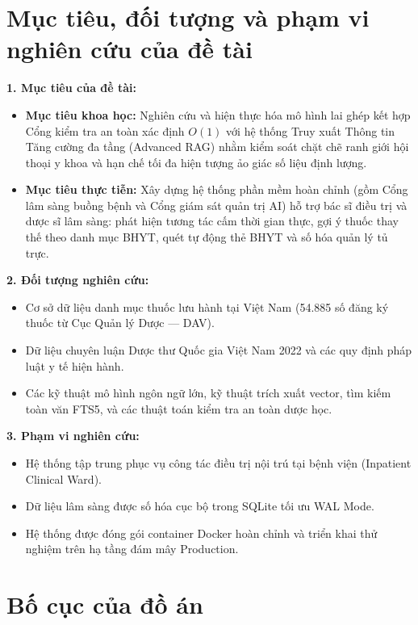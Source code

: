 \section{Mục tiêu, đối tượng và phạm vi nghiên cứu của đề tài}
\label{sec:objectives_scope}

\noindent\textbf{1. Mục tiêu của đề tài:}
\begin{itemize}[leftmargin=1.5em]
    \item \textbf{Mục tiêu khoa học:} Nghiên cứu và hiện thực hóa mô hình lai ghép kết hợp Cổng kiểm tra an toàn xác định $O(1)$ với hệ thống Truy xuất Thông tin Tăng cường đa tầng (Advanced RAG) nhằm kiểm soát chặt chẽ ranh giới hội thoại y khoa và hạn chế tối đa hiện tượng ảo giác số liệu định lượng.
    \item \textbf{Mục tiêu thực tiễn:} Xây dựng hệ thống phần mềm hoàn chỉnh (gồm Cổng lâm sàng buồng bệnh và Cổng giám sát quản trị AI) hỗ trợ bác sĩ điều trị và dược sĩ lâm sàng: phát hiện tương tác cấm thời gian thực, gợi ý thuốc thay thế theo danh mục BHYT, quét tự động thẻ BHYT và số hóa quản lý tủ trực.
\end{itemize}

\noindent\textbf{2. Đối tượng nghiên cứu:}
\begin{itemize}[leftmargin=1.5em]
    \item Cơ sở dữ liệu danh mục thuốc lưu hành tại Việt Nam (54.885 số đăng ký thuốc từ Cục Quản lý Dược --- DAV).
    \item Dữ liệu chuyên luận Dược thư Quốc gia Việt Nam 2022 và các quy định pháp luật y tế hiện hành.
    \item Các kỹ thuật mô hình ngôn ngữ lớn, kỹ thuật trích xuất vector, tìm kiếm toàn văn FTS5, và các thuật toán kiểm tra an toàn dược học.
\end{itemize}

\noindent\textbf{3. Phạm vi nghiên cứu:}
\begin{itemize}[leftmargin=1.5em]
    \item Hệ thống tập trung phục vụ công tác điều trị nội trú tại bệnh viện (Inpatient Clinical Ward).
    \item Dữ liệu lâm sàng được số hóa cục bộ trong SQLite tối ưu WAL Mode.
    \item Hệ thống được đóng gói container Docker hoàn chỉnh và triển khai thử nghiệm trên hạ tầng đám mây Production.
\end{itemize}

\section{Bố cục của đồ án}
\label{sec:report_structure}

